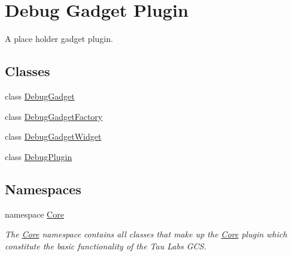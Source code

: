 \hypertarget{group___debug_gadget_plugin}{\section{\-Debug \-Gadget \-Plugin}
\label{group___debug_gadget_plugin}
}


\-A place holder gadget plugin.  


\subsection*{\-Classes}
\begin{DoxyCompactItemize}
\item 
class \hyperlink{class_debug_gadget}{\-Debug\-Gadget}
\item 
class \hyperlink{class_debug_gadget_factory}{\-Debug\-Gadget\-Factory}
\item 
class \hyperlink{class_debug_gadget_widget}{\-Debug\-Gadget\-Widget}
\item 
class \hyperlink{class_debug_plugin}{\-Debug\-Plugin}
\end{DoxyCompactItemize}
\subsection*{\-Namespaces}
\begin{DoxyCompactItemize}
\item 
namespace \hyperlink{namespace_core}{\-Core}
\begin{DoxyCompactList}\small\item\em \-The \hyperlink{namespace_core}{\-Core} namespace contains all classes that make up the \hyperlink{namespace_core}{\-Core} plugin which constitute the basic functionality of the \-Tau \-Labs \-G\-C\-S. \end{DoxyCompactList}\end{DoxyCompactItemize}
